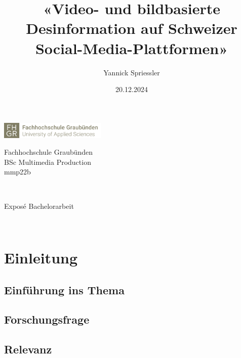 \documentclass[12pt,a4paper]{article}        %
\title{«Video- und bildbasierte Desinformation auf Schweizer Social-Media-Plattformen»}        %
\author{Yannick Spriessler}     %
\date{20.12.2024}     %
\begin{document}
  
    \begin{titlingpage} %
    \includegraphics[height=30px]{fh-logo.png}\\   %
    \begin{large}
    Fachhochschule Graubünden\\ %
    BSc Multimedia Production\\
    mmp22b
    \end{large}
    \vspace{1cm} %
    \begin{center}
    \begin{LARGE} 
    \textbf{\thetitle} \\
    \end{LARGE}
    \begin{large}
    Exposé Bachelorarbeit\\
    \end{large}
    \vspace{1cm} %
    \theauthor\\
    \thedate
    \end{center}
    \end{titlingpage}
    

    \section{Einleitung}
    \subsection{Einführung ins Thema}
    \subsection{Forschungsfrage}
    \subsection{Relevanz}
\end{document}
